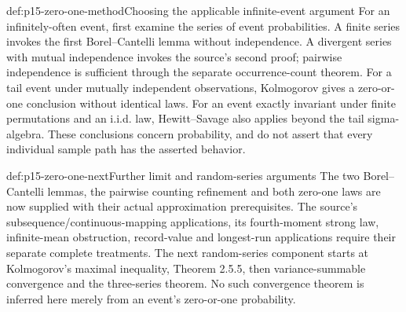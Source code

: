 \begin{hbmethod}{def:p15-zero-one-method}{Choosing the applicable infinite-event argument}
For an infinitely-often event, first examine the series of event
probabilities. A finite series invokes the first Borel--Cantelli lemma
without independence. A divergent series with mutual independence invokes
the source's second proof; pairwise independence is sufficient through
the separate occurrence-count theorem. For a tail event under mutually
independent observations, Kolmogorov gives a zero-or-one conclusion
without identical laws. For an event exactly invariant under finite
permutations and an i.i.d. law, Hewitt--Savage also applies beyond the tail
sigma-algebra. These conclusions concern probability, and do not assert
that every individual sample path has the asserted behavior.
\end{hbmethod}

\begin{proofboundary}{def:p15-zero-one-next}{Further limit and random-series arguments}
The two Borel--Cantelli lemmas, the pairwise counting refinement and both
zero-one laws are now supplied with their actual approximation prerequisites.
The source's subsequence/continuous-mapping applications, its fourth-moment
strong law, infinite-mean obstruction, record-value and longest-run
applications require their separate complete treatments. The next
random-series component starts at Kolmogorov's maximal inequality,
Theorem 2.5.5, then variance-summable convergence and the three-series
theorem. No such convergence theorem is inferred here merely from an
event's zero-or-one probability.
\end{proofboundary}
